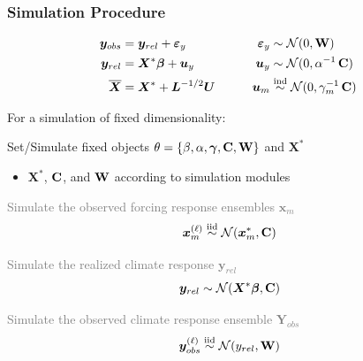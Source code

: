 \documentclass{beamer}
\newcommand{\C}{\ensuremath{\text{Cov}}}
\newcommand{\iid}{\ensuremath{\stackrel{\text{iid}}{\sim}}}
\newcommand{\light}[1]{\textcolor{gray}{#1}}
\def\*#1{\bm{#1}}
\def\C{\textbf{\text{C}}}
\def\W{\textbf{\text{W}}}
\begin{document}
\begin{frame}
\frametitle{Simulation Procedure}

\begin{block}{}
\vspace*{-\baselineskip}\setlength\belowdisplayshortskip{0pt}
\begin{alignat*}{3}
\*y_{obs} &= \*y_{rel} + \*\varepsilon_y  \qquad \quad &\*\varepsilon_y &\sim \mathcal N(0,\W)\\
\*y_{rel} &= \*X^* \*\beta + \*u_y \nonumber  \qquad  &\*u_y &\sim \mathcal N(0,\alpha^{-1}\,\C) \\
\overline{\*X} &= \*X^* + \*L^{-1/2} \*U \qquad    &\*u_m &\stackrel{\text{ind}}{\sim} \mathcal N(0,\gamma_m^{-1} \, \C)  \:
\end{alignat*}
\end{block}

For a simulation of fixed dimensionality:
\begin{itemize}
\item[1)] Set/Simulate fixed objects $\theta = \{ \beta, \alpha, \*\gamma , \C, \W \}$ and $\*X^*$
\begin{itemize}
\item$\*X^*$, $\C$, and $\W$ according to simulation modules
\end{itemize}
\item[\light{2a)}] \light{Simulate the observed forcing response ensembles $\*x_m$ 
\[
\*x^{(\ell)}_m \iid \mathcal N ( \*x_m^*, \C)
\]
\item[\light{2b)}]Simulate the realized climate response $\* y_{rel}$
\[
\*y_{rel} \sim \mathcal N ( \*X^* \* \beta, \C)
\]}
\item[\light{3)}] \light{Simulate the observed climate response ensemble $\*Y_{obs}$}
\light{\[
\*y_{obs}^{(\ell)} \iid \mathcal N ( y_{rel}, \W)
\]}
\end{itemize}
\end{frame}

%
\end{document}
